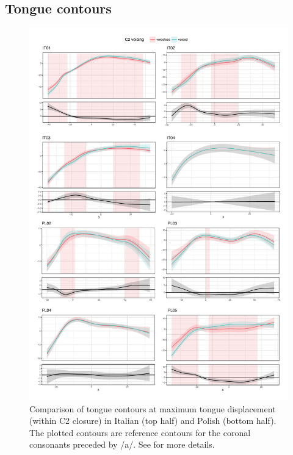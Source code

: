 \documentclass[authoryear, twocolumn]{elsarticle}
\begin{document}
\subsection{Tongue contours}\label{tongue-contours}

\label{s:splines}

\begin{figure}
    \centering
    \includegraphics[height=.9\textheight]{fig/tra.pdf}
    \caption{Comparison of tongue contours at maximum tongue displacement (within C2 closure) in Italian (top half) and Polish (bottom half). The plotted contours are reference contours for the coronal consonants preceded by /a/. See  for more details.}
    \label{f:tra}
\end{figure}
\end{document}
